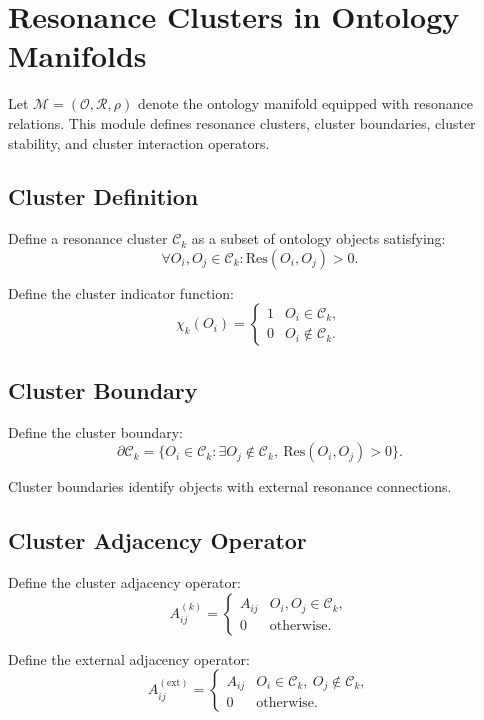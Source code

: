 \section{Resonance Clusters in Ontology Manifolds}

Let $\mathcal{M} = (\mathcal{O}, \mathcal{R}, \rho)$ denote the ontology
manifold equipped with resonance relations. This module defines resonance
clusters, cluster boundaries, cluster stability, and cluster interaction
operators.

\subsection{Cluster Definition}

Define a resonance cluster $\mathcal{C}_k$ as a subset of ontology objects
satisfying:
\[
\forall O_i, O_j \in \mathcal{C}_k : \mathrm{Res}(O_i, O_j) > 0.
\]

Define the cluster indicator function:
\[
\chi_k(O_i) =
\begin{cases}
1 & O_i \in \mathcal{C}_k, \\
0 & O_i \notin \mathcal{C}_k.
\end{cases}
\]

\subsection{Cluster Boundary}

Define the cluster boundary:
\[
\partial \mathcal{C}_k = \{ O_i \in \mathcal{C}_k :
\exists O_j \notin \mathcal{C}_k, \ \mathrm{Res}(O_i, O_j) > 0 \}.
\]

Cluster boundaries identify objects with external resonance connections.

\subsection{Cluster Adjacency Operator}

Define the cluster adjacency operator:
\[
A^{(k)}_{ij} =
\begin{cases}
A_{ij} & O_i, O_j \in \mathcal{C}_k, \\
0 & \text{otherwise}.
\end{cases}
\]

Define the external adjacency operator:
\[
A^{(\mathrm{ext})}_{ij} =
\begin{cases}
A_{ij} & O_i \in \mathcal{C}_k, \ O_j \notin \mathcal{C}_k, \\
0 & \text{otherwise}.
\end{cases}
\]

